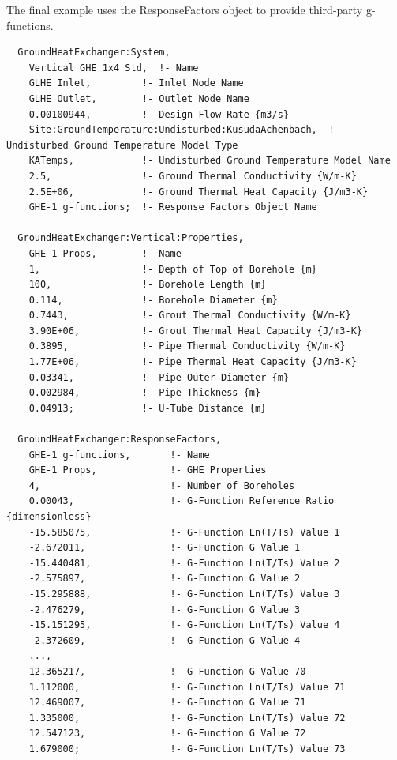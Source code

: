 The final example uses the ResponseFactors object to provide third-party g-functions.

\begin{lstlisting}
  GroundHeatExchanger:System,
    Vertical GHE 1x4 Std,  !- Name
    GLHE Inlet,         !- Inlet Node Name
    GLHE Outlet,        !- Outlet Node Name
    0.00100944,         !- Design Flow Rate {m3/s}
    Site:GroundTemperature:Undisturbed:KusudaAchenbach,  !- Undisturbed Ground Temperature Model Type
    KATemps,            !- Undisturbed Ground Temperature Model Name
    2.5,                !- Ground Thermal Conductivity {W/m-K}
    2.5E+06,            !- Ground Thermal Heat Capacity {J/m3-K}
    GHE-1 g-functions;  !- Response Factors Object Name

  GroundHeatExchanger:Vertical:Properties,
    GHE-1 Props,        !- Name
    1,                  !- Depth of Top of Borehole {m}
    100,                !- Borehole Length {m}
    0.114,              !- Borehole Diameter {m}
    0.7443,             !- Grout Thermal Conductivity {W/m-K}
    3.90E+06,           !- Grout Thermal Heat Capacity {J/m3-K}
    0.3895,             !- Pipe Thermal Conductivity {W/m-K}
    1.77E+06,           !- Pipe Thermal Heat Capacity {J/m3-K}
    0.03341,            !- Pipe Outer Diameter {m}
    0.002984,           !- Pipe Thickness {m}
    0.04913;            !- U-Tube Distance {m}

  GroundHeatExchanger:ResponseFactors,
    GHE-1 g-functions,       !- Name
    GHE-1 Props,             !- GHE Properties
    4,                       !- Number of Boreholes
    0.00043,                 !- G-Function Reference Ratio {dimensionless}
    -15.585075,              !- G-Function Ln(T/Ts) Value 1
    -2.672011,               !- G-Function G Value 1
    -15.440481,              !- G-Function Ln(T/Ts) Value 2
    -2.575897,               !- G-Function G Value 2
    -15.295888,              !- G-Function Ln(T/Ts) Value 3
    -2.476279,               !- G-Function G Value 3
    -15.151295,              !- G-Function Ln(T/Ts) Value 4
    -2.372609,               !- G-Function G Value 4
    ...,
    12.365217,               !- G-Function G Value 70
    1.112000,                !- G-Function Ln(T/Ts) Value 71
    12.469007,               !- G-Function G Value 71
    1.335000,                !- G-Function Ln(T/Ts) Value 72
    12.547123,               !- G-Function G Value 72
    1.679000;                !- G-Function Ln(T/Ts) Value 73
\end{lstlisting}


